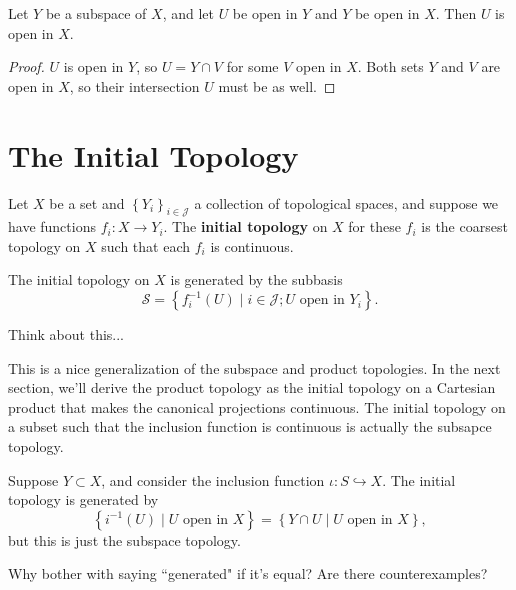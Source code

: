 \documentclass[twoside,10pt]{report}
\begin{document}
\begin{prop}
	Let $Y$ be a subspace of $X$, and let $U$ be open in $Y$ and $Y$ be open in $X$. Then $U$ is open in $X$.
\end{prop}
\begin{proof}
	$U$ is open in $Y$, so $U=Y \cap V$ for some $V$ open in $X$. Both sets $Y$ and $V$ are open in $X$, so their intersection $U$ must be as well.
\end{proof}



\section{The Initial Topology}

\begin{defn}[]
Let $X$ be a set and $\left\{ Y_i \right\}_{i \in \mathcal{J}}$ a collection of topological spaces, and suppose we have functions $f_i: X\to Y_i$. The \textbf{initial topology} on $X$ for these $f_i$ is the coarsest topology on $X$ such that each $f_i$ is continuous.
\end{defn}

\begin{prop}
The initial topology on $X$ is generated by the subbasis
\[
	\mathcal{S} = \left\{ f_i^{-1}(U) \;|\; i \in \mathcal{J}; U \text{ open in } Y_i \right\}.
\]
\end{prop}
{\color{red}Think about this...}

This is a nice generalization of the subspace and product topologies. In the next section, we'll derive the product topology as the initial topology on a Cartesian product that makes the canonical projections continuous. The initial topology on a subset such that the inclusion function is continuous is actually the subsapce topology.

\begin{ex}[]
	Suppose $Y \subset X$, and consider the inclusion function $\iota:S \hookrightarrow X$. The initial topology is generated by
	\[
		\left\{ i^{-1}(U) \;|\; U \text{ open in } X \right\} = \left\{ Y \cap U \;|\; U \text{ open in } X \right\},
	\] but this is just the subspace topology.

	{\color{red}Why bother with saying ``generated" if it's equal? Are there counterexamples?}
\end{ex}


\end{document}
